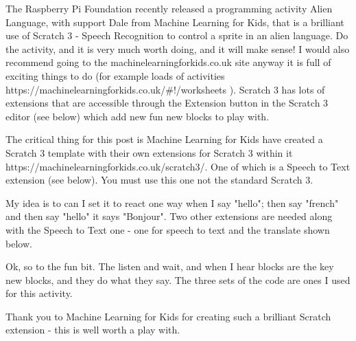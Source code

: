The Raspberry Pi Foundation recently released a programming activity Alien Language, with support Dale from Machine Learning for Kids, that is a brilliant use of Scratch 3 - Speech Recognition to control a sprite in an alien language. Do the activity, and it is very much worth doing, and it will make sense! I  would also recommend going to the machinelearningforkids.co.uk site anyway it is full of exciting things to do (for example loads of activities https://machinelearningforkids.co.uk/#!/worksheets ). Scratch 3 has lots of extensions that are accessible through the Extension button in the Scratch 3 editor (see below) which add new fun new blocks to play with.




The critical thing for this post is Machine Learning for Kids have created a Scratch 3 template with their own extensions for Scratch 3 within it https://machinelearningforkids.co.uk/scratch3/. One of which is a Speech to Text extension (see below). You must use this one not the standard Scratch 3.




My idea is to can I set it to react one way when I say "hello"; then say "french" and then say "hello" it says "Bonjour". Two other extensions are needed along with the Speech to Text one - one for speech to text and the translate shown below.




Ok, so to the fun bit. The listen and wait, and when I hear blocks are the key new blocks, and they do what they say. The three sets of the code are ones I used for this activity.







Thank you to Machine Learning for Kids for creating such a brilliant Scratch extension - this is well worth a play with.

